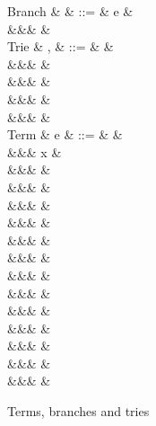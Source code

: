 \begin{figure}
\begin{syntaxfig}
\mbox{Branch}
&
\kappa
&
::=
&
e
&
\\
&&&
\sigma
&
\\[2mm]
\mbox{Trie}
&
\sigma, \tau
&
::=
&
&
\\
&&&
\trieUnit{\kappa}
&
\\
&&&
\trieSum{\sigma}{\tau}
&
\\
&&&
\trieProd{\sigma}
&
\\
&&&
\trieRoll{\sigma}
&
\\[2mm]
\mbox{Term}
&
e
&
::=
&
&
\\
&&&
x
&
\\
&&&
\exUnit
&
\\
&&&
&
\\
&&&
&
\\
&&&
&
\\
&&&
&
\\
&&&
&
\\
&&&
&
\\
&&&
&
\\
&&&
\exFun{\sigma}
&
\\
&&&
&
\\
&&&
&
\\
&&&
&
\\
&&&
&
\end{syntaxfig}
\caption{Terms, branches and tries}
\end{figure}
